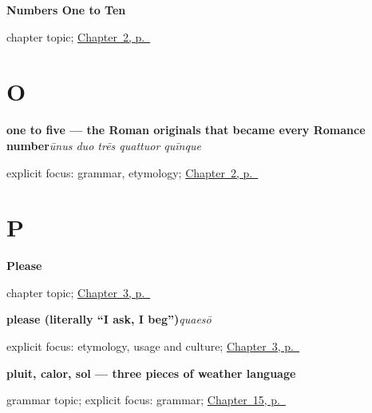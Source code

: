 \noindent\begin{minipage}[t]{\linewidth}
\raggedright
\textbf{Numbers One to Ten}\par
\footnotesize chapter topic; \hyperref[ch:la-numbers-one-to-ten]{Chapter~2, p.~\pageref*{ch:la-numbers-one-to-ten}}
\end{minipage}\par\smallskip

\section*{O}

\noindent\begin{minipage}[t]{\linewidth}
\raggedright
\textbf{one to five — the Roman originals that became every Romance number}\enspace\emph{ūnus duo trēs quattuor quīnque}\par
\footnotesize explicit focus: grammar, etymology; \hyperref[ch:la-numbers-one-to-ten]{Chapter~2, p.~\pageref*{ch:la-numbers-one-to-ten}}
\end{minipage}\par\smallskip

\section*{P}

\noindent\begin{minipage}[t]{\linewidth}
\raggedright
\textbf{Please}\par
\footnotesize chapter topic; \hyperref[ch:la-please]{Chapter~3, p.~\pageref*{ch:la-please}}
\end{minipage}\par\smallskip

\noindent\begin{minipage}[t]{\linewidth}
\raggedright
\textbf{please (literally \textquotedblleft{}I ask, I beg\textquotedblright{})}\enspace\emph{quaesō}\par
\footnotesize explicit focus: etymology, usage and culture; \hyperref[ch:la-please]{Chapter~3, p.~\pageref*{ch:la-please}}
\end{minipage}\par\smallskip

\noindent\begin{minipage}[t]{\linewidth}
\raggedright
\textbf{pluit, calor, sol — three pieces of weather language}\par
\footnotesize grammar topic; explicit focus: grammar; \hyperref[ch:la-weather]{Chapter~15, p.~\pageref*{ch:la-weather}}
\end{minipage}\par\smallskip


